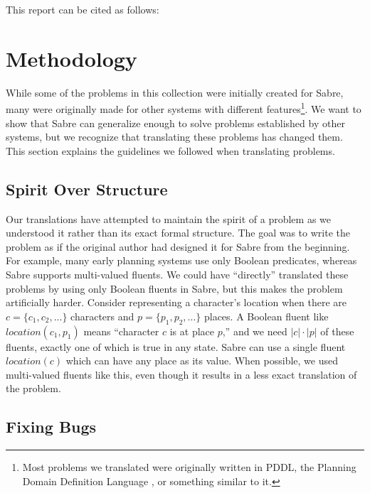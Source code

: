 \documentclass{nilreport}
\makeatletter
\renewcommand{\bibentry}[1]{\nocite{#1}{\frenchspacing\@nameuse{BR@r@#1\@extra@b@citeb}}}
\makeatother
\begin{document}
\medskip{}

\noindent This report can be cited as follows:

\begin{quote}
	\bibentry{ware2023collection}
\end{quote}

\section{Methodology}

While some of the problems in this collection were initially created
for Sabre, many were originally made for other systems with different
features\footnote{Most problems we translated were originally written in PDDL, the Planning
Domain Definition Language \cite{malik1998pddl}, or something similar
to it.}. We want to show that Sabre can generalize enough to solve problems
established by other systems, but we recognize that translating these
problems has changed them. This section explains the guidelines we
followed when translating problems.

\subsection{Spirit Over Structure}

Our translations have attempted to maintain the spirit of a problem
as we understood it rather than its exact formal structure. The goal
was to write the problem as if the original author had designed it
for Sabre from the beginning. For example, many early planning systems
use only Boolean predicates, whereas Sabre supports multi-valued fluents.
We could have ``directly'' translated these problems by using only
Boolean fluents in Sabre, but this makes the problem artificially
harder. Consider representing a character's location when there are
\emph{$c=\{c_{1},c_{2},...\}$} characters and \emph{$p=\{p_{1},p_{2},...\}$}
places. A Boolean fluent like $location(c_{1},p_{1})$ means ``character
$c$ is at place $p$,'' and we need $|c|\cdot|p|$ of these fluents,
exactly one of which is true in any state. Sabre can use a single
fluent $location(c)$ which can have any place as its value. When
possible, we used multi-valued fluents like this, even though it results
in a less exact translation of the problem.

\subsection{Fixing Bugs}
\end{document}
